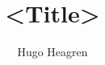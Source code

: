 \documentclass[12pt]{article}
\title{<Title>}
\date{}
\author{Hugo Heagren}
\theoremstyle{mytheoremstyle} %
\begin{document}
\maketitle

\printbibliography[]
\end{document}
